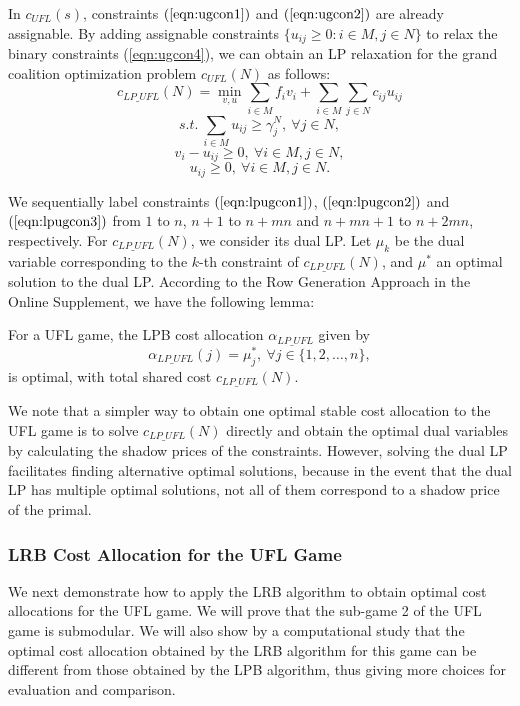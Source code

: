 In $c_{UFL}(s)$, constraints $(\ref{eqn:ugcon1})$ and  $(\ref{eqn:ugcon2})$ are already assignable. By adding assignable constraints $\{u_{ij} \geq 0:i \in M, j \in N\}$ to relax the binary constraints (\ref{eqn:ugcon4}), we can obtain an LP relaxation for the grand coalition optimization problem $c_{UFL}(N)$ as follows:
\begin{equation*}\label{eqn:lpugobj}
c_{LP\_UFL}(N) = \min_{v,u} \sum_{i \in M} f_iv_i + \sum_{i \in M} \sum_{j \in N} c_{ij}u_{ij}
\end{equation*}
\begin{equation} \label{eqn:lpugcon1}
s.t.~\sum_{i \in M} u_{ij} \geq \gamma_j^N, ~\forall j \in N,
\end{equation}
\begin{equation}\label{eqn:lpugcon2}
v_i - u_{ij} \geq 0, ~\forall i \in M, j \in N,
\end{equation}
\begin{equation}\label{eqn:lpugcon3}
u_{ij} \geq 0, ~\forall i \in M, j \in N.
\end{equation}

We sequentially label constraints $(\ref{eqn:lpugcon1})$, $(\ref{eqn:lpugcon2})$ and $(\ref{eqn:lpugcon3})$ from $1$ to $n$, $n+1$ to $n+mn$ and $n+mn+1$ to $n+2mn$, respectively.
For $c_{LP\_UFL}(N)$, we consider its dual LP. Let $\mu_k$  be the dual variable corresponding to the $k$-th constraint of $c_{LP\_UFL}(N)$, and $\mu^*$ an optimal solution to the dual LP.
According to the Row Generation Approach in the Online Supplement, we have the following lemma:
\begin{lemma}\label{lemma:lpbcaufl}
For a UFL game, the LPB cost allocation $\alpha_{LP\_UFL}$ given by
\begin{equation*}
\alpha_{LP\_UFL}(j) = \mu_j^*, ~\forall j \in \big\{1,2,\ldots,n\big\},
\end{equation*}
is optimal, with total shared cost $c_{LP\_UFL}(N)$.
\end{lemma}

We note that a simpler way to obtain one optimal stable cost allocation to the UFL game is to solve $c_{LP\_UFL}(N)$ directly and obtain the optimal dual variables by calculating the shadow prices of the constraints.
However, solving the dual LP facilitates finding alternative optimal solutions, because in the event that the dual LP has multiple optimal solutions, not all of them correspond to a shadow price of the primal.


\subsubsection{LRB Cost Allocation for the UFL Game}\label{section:UFLLRB}
We next demonstrate how to apply the LRB algorithm to obtain optimal cost allocations for the UFL game. We will prove that the sub-game 2 of the UFL game is submodular. We will also show by a computational study that the optimal cost allocation obtained by the LRB algorithm for this game can be different from those obtained by the LPB algorithm, thus giving more choices for evaluation and comparison.

